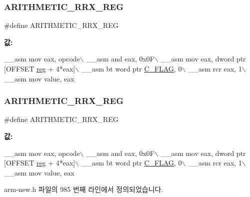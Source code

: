 \subsubsection{\texorpdfstring{A\+R\+I\+T\+H\+M\+E\+T\+I\+C\+\_\+\+R\+R\+X\+\_\+\+R\+EG}{ARITHMETIC\_RRX\_REG}\hspace{0.1cm}{\footnotesize\ttfamily [1/2]}}
{\footnotesize\ttfamily \#define A\+R\+I\+T\+H\+M\+E\+T\+I\+C\+\_\+\+R\+R\+X\+\_\+\+R\+EG}

{\bfseries 값\+:}
\begin{DoxyCode}
\_\_asm mov eax, opcode\(\backslash\)
        \_\_asm and eax, 0x0F\(\backslash\)
        \_\_asm mov eax, dword ptr [OFFSET \mbox{\hyperlink{_g_b_a_8h_ae29faba89509024ffd1a292badcedf2d}{reg}} + 4*eax]\(\backslash\)
        \_\_asm bt word ptr \mbox{\hyperlink{_g_b_8h_aa29c80f7f7f901ec7a2c57887f56585d}{C\_FLAG}}, 0\(\backslash\)
        \_\_asm rcr eax, 1\(\backslash\)
        \_\_asm mov value, eax
\end{DoxyCode}
\mbox{\label{arm-new_8h_a975d05336b289f7576556fbeba15a5c4}} 
\subsubsection{\texorpdfstring{A\+R\+I\+T\+H\+M\+E\+T\+I\+C\+\_\+\+R\+R\+X\+\_\+\+R\+EG}{ARITHMETIC\_RRX\_REG}\hspace{0.1cm}{\footnotesize\ttfamily [2/2]}}
{\footnotesize\ttfamily \#define A\+R\+I\+T\+H\+M\+E\+T\+I\+C\+\_\+\+R\+R\+X\+\_\+\+R\+EG}

{\bfseries 값\+:}
\begin{DoxyCode}
\_\_asm mov eax, opcode\(\backslash\)
        \_\_asm and eax, 0x0F\(\backslash\)
        \_\_asm mov eax, dword ptr [OFFSET \mbox{\hyperlink{_g_b_a_8h_ae29faba89509024ffd1a292badcedf2d}{reg}} + 4*eax]\(\backslash\)
        \_\_asm bt word ptr \mbox{\hyperlink{_g_b_8h_aa29c80f7f7f901ec7a2c57887f56585d}{C\_FLAG}}, 0\(\backslash\)
        \_\_asm rcr eax, 1\(\backslash\)
        \_\_asm mov value, eax
\end{DoxyCode}


arm-\/new.\+h 파일의 985 번째 라인에서 정의되었습니다.

